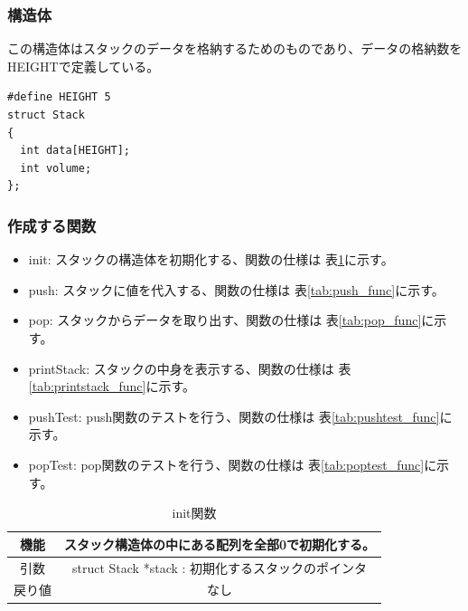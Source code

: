 \documentclass[dvipdfmx]{jsarticle}
\begin{document}
\subsubsection{構造体}
この構造体はスタックのデータを格納するためのものであり、データの格納数をHEIGHTで定義している。
\begin{lstlisting}[caption={stack.h}, label={lst:stackh}]
#define HEIGHT 5
struct Stack
{
  int data[HEIGHT];
  int volume;
};
\end{lstlisting}
\subsubsection{作成する関数}
\begin{itemize}
  \item init: スタックの構造体を初期化する、関数の仕様は 表\ref{tab:init_func}に示す。
  \item push: スタックに値を代入する、関数の仕様は 表\ref{tab:push_func}に示す。
  \item pop: スタックからデータを取り出す、関数の仕様は 表\ref{tab:pop_func}に示す。
  \item printStack: スタックの中身を表示する、関数の仕様は 表\ref{tab:printstack_func}に示す。
  \item pushTest: push関数のテストを行う、関数の仕様は 表\ref{tab:pushtest_func}に示す。
  \item popTest: pop関数のテストを行う、関数の仕様は 表\ref{tab:poptest_func}に示す。
\end{itemize}

\begin{table}[ht]
  \centering
  \begin{tabular}{|c|c|}
    \hline
    機能  & スタック構造体の中にある配列を全部0で初期化する。            \\
    \hline
    引数  & struct Stack *stack : 初期化するスタックのポインタ \\
    \hline
    戻り値 & なし                                   \\
    \hline
  \end{tabular}
  \caption{init関数}
  \label{tab:init_func}
\end{table}
\end{document}
